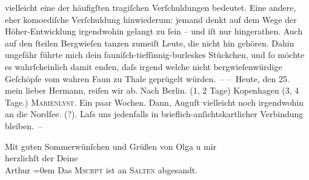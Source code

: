                vielleicht eine der häufigſten tragiſchen Verſchuldungen bedeutet. Eine andere, eher
               komoediſche Verſchuldung hinwiederum: jemand denkt auf dem Wege der \introOben{}Höher-\introOben{}Entwicklung irgendwohin gelangt  zu ſein – und iſt nur \label{K_L01604-3v}\label{K_L01604-3} hingerathen.
               Auch auf den ſteilen Bergwieſen tanzen zumeiſt Leute, die nicht hin gehören. Dahin
               ungefähr führte mich dein fauniſch-tiefſinnig-burleskes Stückchen, und ſo möchte es wahrſcheinlich
               damit {\pb}enden, daſs
               irgend welche nicht bergwieſenwürdige Geſchöpfe vom wahren Faun zu Thale geprügelt
               würden. –\pend
           \vspace{1em}
\pstart
           \noindent{}– Heute, \introOben{}den 25.\introOben{} mein lieber Hermann, reiſen wir ab. Nach
                  Berlin. (1, 2 Tage) Kopenhagen (3, 4 Tage.) \textsc{Marienlyst}. Ein paar Wochen. Dann, Auguſt vielleicht noch irgendwohin an die Nordſee. (\label{K_L01604-4v}\label{K_L01604-4}?). Laſs uns jedenfalls in brieflich-anſichtskartlicher Verbindung
               bleiben. – \pend
           
\pstart
           Mit guten Sommerwünſchen und {\pb}Grüßen von Olga u mir{\\[\baselineskip]}herzlichſt der Deine{\\[\baselineskip]}\spacefill\mbox{Arthur}\pend
           \leftskip=0em{}\vspace{1em}
\pstart
           \noindent{}Das \textsc{Mscrpt} ist an \textsc{Salten} abgesandt.\pend
           \endnumbering{}  
      